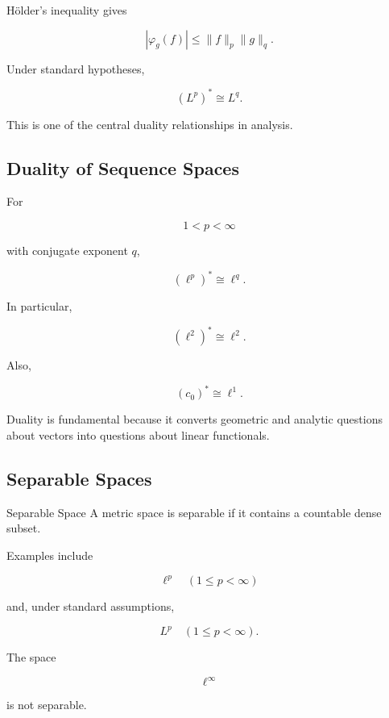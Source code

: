 H\"older's inequality gives

\[
|\varphi_g(f)|
\leq
\|f\|_p\|g\|_q.
\]

Under standard hypotheses,

\[
\boxed{
(L^p)^*
\cong
L^q.
}
\]

This is one of the central duality relationships in analysis.

\subsection{Duality of Sequence Spaces}
\label{subsec:duality-sequence-spaces}

For

\[
1<p<\infty
\]

with conjugate exponent \(q\),

\[
\boxed{
(\ell^p)^*
\cong
\ell^q.
}
\]

In particular,

\[
\boxed{
(\ell^2)^*
\cong
\ell^2.
}
\]

Also,

\[
\boxed{
(c_0)^*
\cong
\ell^1.
}
\]

Duality is fundamental because it converts geometric and analytic
questions about vectors into questions about linear functionals.

\subsection{Separable Spaces}
\label{subsec:separable-spaces-functional}

\begin{definitionbox}{Separable Space}
A metric space is separable if it contains a countable dense subset.
\end{definitionbox}

Examples include

\[
\boxed{
\ell^p
\quad
(1\leq p<\infty)
}
\]

and, under standard assumptions,

\[
\boxed{
L^p
\quad
(1\leq p<\infty).
}
\]

The space

\[
\ell^\infty
\]

is not separable.


